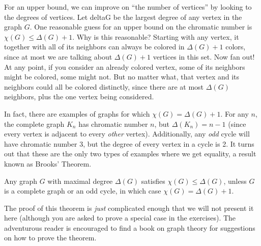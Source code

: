 \documentclass[12pt]{article}
\begin{document}
For an upper bound, we can improve on ``the number of vertices'' by looking to the degrees of vertices.  Let \gls{deltaG} be the largest degree of any vertex in the graph $G$.  One reasonable guess for an upper bound on the chromatic number is $\chi(G) \le \Delta(G) + 1$.  Why is this reasonable?  Starting with any vertex, it together with all of its neighbors can always be colored in $\Delta(G) + 1$ colors, since at most we are talking about $\Delta(G) + 1$ vertices in this set.  Now fan out!  At any point, if you consider an already colored vertex, some of its neighbors might be colored, some might not.  But no matter what, that vertex and its neighbors could all be colored distinctly, since there are at most $\Delta(G)$ neighbors, plus the one vertex being considered.

In fact, there are examples of graphs for which $\chi(G) = \Delta(G) + 1$.  For any $n$, the complete graph $K_n$ has chromatic number $n$, but $\Delta(K_n) = n-1$ (since every vertex is adjacent to every \emph{other} vertex).  Additionally, any \emph{odd} cycle will have chromatic number 3, but the degree of every vertex in a cycle is 2.  It turns out that these are the only two types of examples where we get equality, a result known as Brooks' Theorem.

\begin{theorem}
Any graph $G$ with maximal degree $\Delta(G)$ satisfies $\chi(G) \le \Delta(G)$, unless $G$ is a complete graph or an odd cycle, in which case $\chi(G) = \Delta(G) + 1$.
\end{theorem}

The proof of this theorem is \emph{just} complicated enough that we will not present it here (although you are asked to prove a special case in the exercises).  The adventurous reader is encouraged to find a book on graph theory for suggestions on how to prove the theorem.
\end{document}
